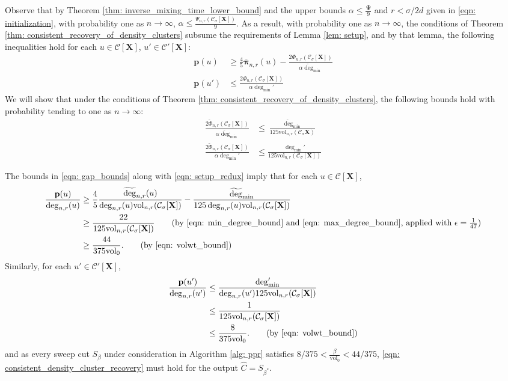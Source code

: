 \documentclass{article}
\newcommand{\vol}{\mathrm{vol}}
\newcommand{\1}{\mathbf{1}}
\newcommand{\degminpr}{\deg_{\min}'}
\newcommand{\degminwt}{\widetilde{\deg}_{\min}}
\newcommand{\pbf}{\mathbf{p}}
\newcommand{\pibf}{\bm{\pi}}
\newcommand{\Xbf}{\mathbf{X}}
\newcommand{\Cset}{\mathcal{C}}
\newcommand{\Csig}{\Cset_{\sigma}}
\theoremstyle{aldenthm}
\begin{document}
Observe that by Theorem \ref{thm: inverse_mixing_time_lower_bound} and the upper bounds $\alpha \leq \frac{\mathbf{\Psi}}{9}$ and $r < \sigma/2d$ given in \eqref{eqn: initialization}, with probability one as $n \to \infty$, $\alpha \leq \frac{\Psi_{n,r}(\Csig[\Xbf])}{9}$. As a result, with probability one as $n \to \infty$, the conditions of Theorem \ref{thm: consistent_recovery_of_density_clusters} subsume the requirements of Lemma \ref{lem: setup}, and by that lemma, the following inequalities hold for each $u \in \Cset[\Xbf]$, $u' \in \Cset'[\Xbf]$:
\begin{align}
\pbf(u) & \geq \frac{4}{5} \overline{\pibf}_{n,r}(u) - \frac{2 \Phi_{n,r}(\Csig[\Xbf])}{\alpha \degminwt} \nonumber \\
\pbf(u') & \leq \frac{2 \Phi_{n,r}(\Csig[\Xbf])}{\alpha \degminpr} \label{eqn: setup_redux}
\end{align}
We will show that under the conditions of Theorem \ref{thm: consistent_recovery_of_density_clusters}, the following bounds hold with probability tending to one as $n \to \infty$:
\begin{align}
\frac{2\widetilde{\Phi}_{n,r}(\Csig[\Xbf])}{\alpha \degminwt} & \leq \frac{\degminwt}{125 \vol_{n,r}(\Csig{\Xbf})} \nonumber \\
\frac{2\widetilde{\Phi}_{n,r}(\Csig[\Xbf])}{\alpha \degminpr} & \leq \frac{\degminpr}{125 \vol_{n,r}(\Csig[\Xbf])} \label{eqn: gap_bounds}
\end{align}

The bounds in \eqref{eqn: gap_bounds} along with \eqref{eqn: setup_redux} imply that for each $u \in \Cset[\Xbf]$,
\begin{align*}
\frac{\pbf(u)}{\deg_{n,r}(u)} & \geq \frac{4}{5} \frac{\widetilde{\deg}_{n,r}(u)}{\deg_{n,r}(u) \vol_{n,r}(\Csig[\Xbf])} - \frac{\degminwt}{125 \deg_{n,r}(u) \vol_{n,r}(\Csig[\Xbf])} \\
& \geq \frac{22}{125 \vol_{n,r}(\Csig[\Xbf])} \tag{by \eqref{eqn: min_degree_bound} and \eqref{eqn: max_degree_bound}, applied with $\epsilon = \frac{1}{47}$} \\
& \geq \frac{44}{375 \vol_0}. \tag{by \eqref{eqn: volwt_bound}}
\end{align*}
Similarly, for each $u' \in \Cset'[\Xbf]$,
\begin{align*}
\frac{\pbf(u')}{\deg_{n,r}(u')} & \leq \frac{\degminpr}{\deg_{n,r}(u') 125 \vol_{n,r}(\Csig[\Xbf])}  \\
& \leq \frac{1}{125 \vol_{n,r}(\Csig[\Xbf])} \\
& \leq \frac{8}{375 \vol_0}. \tag{by \eqref{eqn: volwt_bound}}
\end{align*}
and as every sweep cut $S_\beta$ under consideration in Algorithm \ref{alg: ppr} satisfies $8/375 < \frac{\beta}{\vol_0} < 44/375$, \eqref{eqn: consistent_density_cluster_recovery} must hold for the output $\widehat{C} = S_{\beta^*}$.
\end{document}
